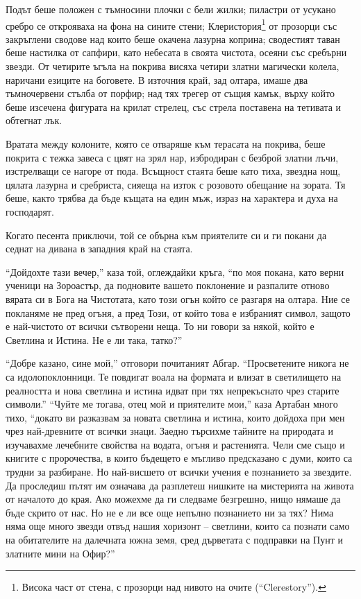 \documentclass[oneside,10pt]{memoir}
\begin{document}
Подът беше положен с тъмносини плочки с бели жилки; пиластри от усукано сребро
се открояваха на фона на сините стени; Клеристория\footnote{Висока част от
стена, с прозорци над нивото на очите (``Clerestory'').} от прозорци със
закръглени сводове над които беше окачена лазурна коприна; сводестият таван беше
настилка от сапфири, като небесата в своята чистота, осеяни със сребърни звезди.
От четирите ъгъла на покрива висяха четири златни магически колела, наричани
езиците на боговете. В източния край, зад олтара, имаше два тъмночервени стълба
от порфир; над тях трегер от същия камък, върху който беше изсечена фигурата на
крилат стрелец, със стрела поставена на тетивата и обтегнат лък.

Вратата между колоните, която се отваряше към терасата на покрива, беше покрита
с тежка завеса с цвят на зрял нар, избродиран с безброй златни лъчи, изстрелващи
се нагоре от пода. Всъщност стаята беше като тиха, звездна нощ, цялата лазурна и
сребриста, сияеща на изток с розовото обещание на зората. Тя беше, както трябва
да бъде къщата на един мъж, израз на характера и духа на господарят.

Когато песента приключи, той се обърна към приятелите си и ги покани да седнат
на дивана в западния край на стаята.

``Дойдохте тази вечер,'' каза той, оглеждайки кръга, ``по моя покана, като верни
ученици на Зороастър, да подновите вашето поклонение и разпалите отново вярата
си в Бога на Чистотата, като този огън който се разгаря на олтара. Ние се
покланяме не пред огъня, а пред Този, от който това е избраният символ, защото е
най-чистото от всички сътворени неща. То ни говори за някой, който е Светлина и
Истина. Не е ли така, татко?''

``Добре казано, сине мой,'' отговори почитаният Абгар. ``Просветените никога не
са идолопоклонници. Те повдигат воала на формата и влизат в светилището на
реалността и нова светлина и истина идват при тях непрекъснато чрез старите
символи.'' ``Чуйте ме тогава, отец мой и приятелите мои,'' каза Артабан много
тихо, ``докато ви разказвам за новата светлина и истина, които дойдоха при мен
чрез най-древните от всички знаци. Заедно търсихме тайните на природата и
изучавахме лечебните свойства на водата, огъня и растенията. Чели сме също и
книгите с пророчества, в които бъдещето е мъгливо предсказано с думи, които са
трудни за разбиране. Но най-висшето от всички учения е познанието за звездите.
Да проследиш пътят им означава да разплетеш нишките на мистерията на живота от
началото до края. Ако можехме да ги следваме безгрешно, нищо нямаше да бъде
скрито от нас. Но не е ли все още непълно познанието ни за тях? Нима няма още
много звезди отвъд нашия хоризонт -- светлини, които са познати само на
обитателите на далечната южна земя, сред дърветата с подправки на Пунт и
златните мини на Офир?''
\end{document}
